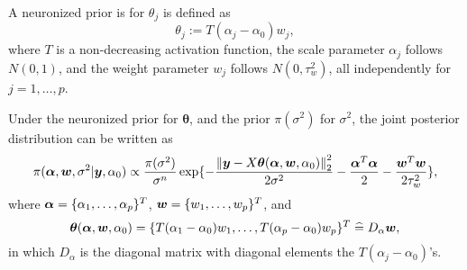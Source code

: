 \begin{definition}
A neuronized prior is for $\theta_j$ is defined as
\begin{equation} \label{eq:neuronized}
    \theta_j := T(\alpha_j-\alpha_0)w_j,
\end{equation}
where $T$ is a non-decreasing activation function, the scale parameter $\alpha_j$ follows $N(0,1)$, and the weight parameter $w_j$ follows $N(0,\tau_w^2)$, all independently for $j = 1, \dots, p$.
\end{definition}

Under the neuronized prior for $\bm{\theta}$, and the prior $\pi(\sigma^2)$ for $\sigma^2$, the joint posterior distribution can be written as
\begin{align} \label{eq:post_joint}
    \pi(\bm{\alpha},\bm{w}, \sigma^2 | \bm{y}, \alpha_0) \propto \frac{\pi(\sigma^2)}{\sigma^n} \exp \{ -\frac{ \left\lVert\bm{y} - X\bm{\theta}(\bm{\alpha}, \bm{w}, \alpha_0)\right\rVert_2^2}{2\sigma^2} -\frac{\bm{\alpha}^T \bm{\alpha}}{2} - \frac{\bm{w}^T \bm{w}}{2\tau_w^2} \},
\end{align}
where  $\bm{\alpha} = \{ \alpha_1, \dots, \alpha_p \}^T$, $\bm{w} = \{w_1, \dots, w_p\}^T$, and 
$$\bm{\theta} (\bm{\alpha}, \bm{w}, \alpha_0) = \{T(\alpha_1 - \alpha_0)w_1, \dots, T(\alpha_p - \alpha_0)w_p \}^T \mathrel{\widehat{=}} D_{\alpha} \bm{w},$$
in which $D_\alpha$ is the diagonal matrix with diagonal elements the $T(\alpha_j - \alpha_0)$'s.